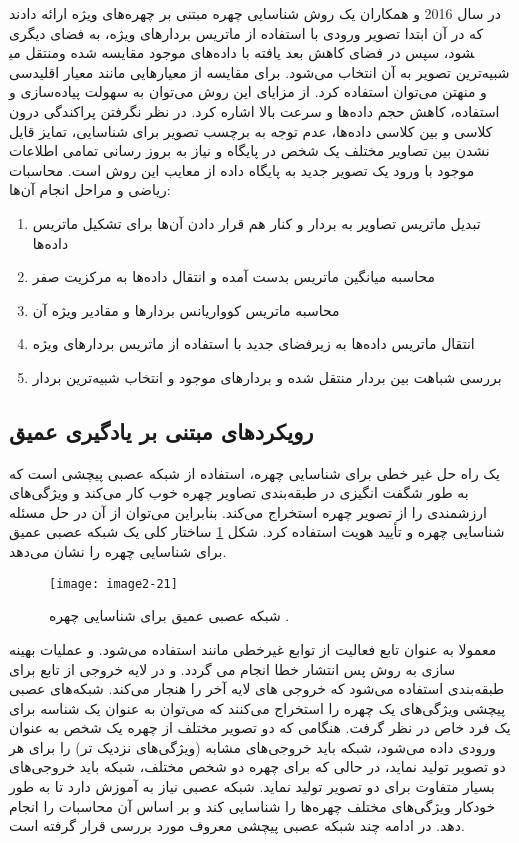 \noindent
در سال 2016  و همکاران \cite{7854053} یک روش شناسایی چهره مبتنی بر چهره‌های ویژه ارائه دادند که در آن ابتدا تصویر ورودی با استفاده از ماتریس بردارهای ویژه، به فضای دیگری منتقل می‎شود، سپس در فضای کاهش بعد یافته با داده‌های موجود مقایسه شده و شبیه‌ترین تصویر به آن انتخاب می‌شود. برای مقایسه از معیارهایی مانند معیار اقلیدسی و منهتن می‌توان استفاده کرد. از مزایای این روش می‌توان به سهولت پیاده‌سازی و استفاده، کاهش حجم داده‌ها و سرعت بالا اشاره کرد. در نظر نگرفتن پراکندگی درون کلاسی و بین کلاسی داده‌ها، عدم توجه به برچسب تصویر برای شناسایی، تمایز قایل نشدن بین تصاویر مختلف یک شخص در پایگاه و نیاز به بروز رسانی تمامی اطلاعات موجود با ورود یک تصویر جدید به پایگاه داده از معایب این روش است. 
محاسبات ریاضی و مراحل انجام آن‌ها:
\begin{enumerate}
\item
	تبدیل ماتریس تصاویر به بردار و کنار هم قرار دادن آن‌ها برای تشکیل ماتریس داده‌ها
\item 
	محاسبه‏ میانگین ماتریس بدست آمده و انتقال داده‌ها به مرکزیت صفر
\item
	محاسبه‏ ماتریس کوواریانس بردارها و مقادیر ویژه‏ آن
\item
	انتقال ماتریس داده‌ها به زیرفضای جدید با استفاده از ماتریس بردارهای ویژه
\item
	بررسی شباهت بین بردار منتقل شده و بردارهای موجود و انتخاب شبیه‌ترین بردار
\end{enumerate}
 
\subsection{رویکردهای مبتنی بر یادگیری عمیق}
یک راه حل غیر خطی برای شناسایی چهره، استفاده از شبکه‌ عصبی پیچشی است که به طور شگفت انگیزی در طبقه‌بندی تصاویر چهره خوب کار می‌کند و ویژگی‌های ارزشمندی را از تصویر چهره استخراج می‌کند. بنابراین می‌توان از آن در حل مسئله شناسایی چهره‌ و تأیید هویت استفاده کرد. شکل \ref{image2-21} ساختار کلی یک شبکه عصبی عمیق برای شناسایی چهره را نشان می‌دهد.
 
\begin{figure}[h]
\centering
  \texttt{[image: image2-21]}
  \caption{شبکه عصبی عمیق برای شناسایی چهره \cite{cnn}.}
  \label{image2-21}
\end{figure}

\noindent
معمولا به عنوان تابع فعالیت از توابع غیرخطی مانند   استفاده می‌شود. و عملیات بهینه سازی به روش پس انتشار خطا انجام می گردد. و در لایه خروجی از تابع  برای طبقه‌بندی استفاده می‌شود که خروجی های لایه آخر را هنجار می‌کند. شبکه‌های عصبی پیچشی ویژگی‌های یک چهره را استخراج می‌کنند که می‌توان به عنوان یک شناسه برای یک فرد خاص در نظر گرفت. هنگامی که دو تصویر مختلف از چهره یک شخص به عنوان ورودی داده می‌شود، شبکه باید خروجی‌های مشابه (ویژگی‌های نزدیک تر) را برای هر دو تصویر تولید نماید، در حالی که برای چهره دو شخص مختلف، شبکه باید خروجی‌های بسیار متفاوت برای دو تصویر تولید نماید. شبکه عصبی نیاز به آموزش دارد تا به طور خودکار ویژگی‌های مختلف چهره‌ها را شناسایی کند و بر اساس آن محاسبات را انجام دهد. در ادامه چند شبکه عصبی پیچشی معروف مورد بررسی قرار گرفته است.

